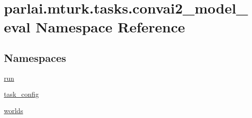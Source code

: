 \hypertarget{namespaceparlai_1_1mturk_1_1tasks_1_1convai2__model__eval}{}\section{parlai.\+mturk.\+tasks.\+convai2\+\_\+model\+\_\+eval Namespace Reference}
\label{namespaceparlai_1_1mturk_1_1tasks_1_1convai2__model__eval}
\subsection*{Namespaces}
\begin{DoxyCompactItemize}
\item 
 \hyperlink{namespaceparlai_1_1mturk_1_1tasks_1_1convai2__model__eval_1_1run}{run}
\item 
 \hyperlink{namespaceparlai_1_1mturk_1_1tasks_1_1convai2__model__eval_1_1task__config}{task\+\_\+config}
\item 
 \hyperlink{namespaceparlai_1_1mturk_1_1tasks_1_1convai2__model__eval_1_1worlds}{worlds}
\end{DoxyCompactItemize}
